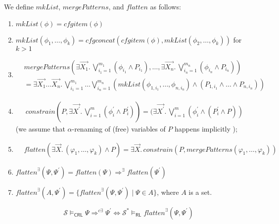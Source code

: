 \documentclass{article}
\newcommand{\jt}[1]{\todo[author=Jan]{#1}}
\newcommand{\RL}{\mathsf{RL}}
\newcommand{\CRL}{\mathsf{CRL}}
\begin{document}
\begin{definition}
We define $\mathit{mkList}$, $\mathit{mergePatterns}$, and $\mathit{flatten}$ as follows:
\begin{enumerate}
    \item $\mathit{mkList}(\phi) = \mathit{cfgitem}(\phi)$
    \item $\mathit{mkList}(\phi_1, \ldots, \phi_k) = \mathit{cfgconcat}(\mathit{cfgitem}(\phi), \mathit{mkList}(\phi_2, \ldots, \phi_k))$ for $k > 1$
    \item
    \begin{align*}
     & \mathit{mergePatterns}(\exists \vec{X_1}.\, \bigvee_{i_{1}=1}^{m_1} (\phi_{i_1} \land P_{i_1}),
     \ldots, \exists \vec{X_n}.\, \bigvee_{i_{n}=1}^{m_n} (\phi_{i_n} \land P_{i_n}))
     \\ & = \exists \vec{X_1}\ldots\vec{X_n}.\, \bigvee_{i_{1}=1}^{m_1} \ldots \bigvee_{i_{n}=1}^{m_n}
       (\mathit{mkList}(\phi_{1, i_1}, \ldots, \phi_{n, i_n}) \land (P_{1, i_1} \land \ldots \land P_{n, i_n}))
    \end{align*}
    \item
        \begin{align*}
            \mathit{constrain}(P, \exists \vec{X^\prime} .\,
            \bigvee_{i=1}^{m} (\phi^\prime_i \land P^\prime_i))
            = (\exists \vec{X^\prime}.\, \bigvee_{i=1}^{m}(\phi^\prime_i \land (P^\prime_i \land P))
    \end{align*}
    (we assume that $\alpha$-renaming of (free) variables of $P$ happens implicitly \jt{?});
    \item
        \begin{align*}
            & \mathit{flatten}(\exists \vec{X}.\, (\varphi_1, \ldots, \varphi_k) \land P)
            = \exists \vec{X}.\, \mathit{constrain}(P, \mathit{mergePatterns}(\varphi_1, \ldots, \varphi_k))
    \end{align*}
    \item $\mathit{flatten}^\exists(\Psi, \Psi^\prime) = \mathit{flatten}(\Psi) \Rightarrow^\exists \mathit{flatten}(\Psi^\prime)$
    \item $\mathit{flatten}^\exists(A, \Psi^\prime) = \{ \mathit{flatten}^\exists(\Psi, \Psi^\prime) \mid \Psi \in A \}$, where $A$ is a set.
\end{enumerate}
\end{definition}

\begin{theorem}\label{thm:correspondence}
\begin{equation*}
\mathcal{S} \vDash_{\CRL} \Psi \Rightarrow^{c\exists} \Psi^\prime \iff \mathcal{S}^* \vDash_\RL \mathit{flatten}^\exists(\Psi, \Psi^\prime)
\end{equation*}
\end{theorem}
\end{document}
